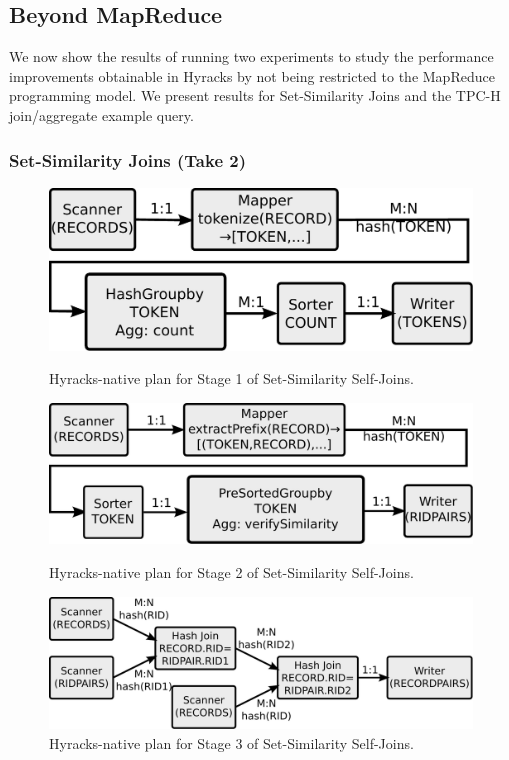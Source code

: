 \subsection{Beyond MapReduce}

We now show the results of running two experiments to study the performance improvements obtainable in Hyracks by not being restricted to the MapReduce programming model.
We present results for Set-Similarity Joins and the TPC-H join/aggregate example query.

\subsubsection{Set-Similarity Joins (Take 2)}

\begin{figure} [htb!]
    \center
    \includegraphics[scale=0.5]{images/fuzzyjoin-hyrax-stage1}
    \caption{Hyracks-native plan for Stage 1 of Set-Similarity Self-Joins.}
    \label{fig:fuzzyjoin-hyrax-stage1}
    \center
    \vspace{.5em}
    \includegraphics[scale=0.5]{images/fuzzyjoin-hyrax-stage2}
    \caption{Hyracks-native plan for Stage 2 of Set-Similarity Self-Joins.}
    \label{fig:fuzzyjoin-hyrax-stage2}
    \center
    \vspace{.5em}
    \includegraphics[scale=0.5]{images/fuzzyjoin-hyrax-stage3}
    \caption{Hyracks-native plan for Stage 3 of Set-Similarity Self-Joins.}
    \label{fig:fuzzyjoin-hyrax-stage3}
\end{figure}

